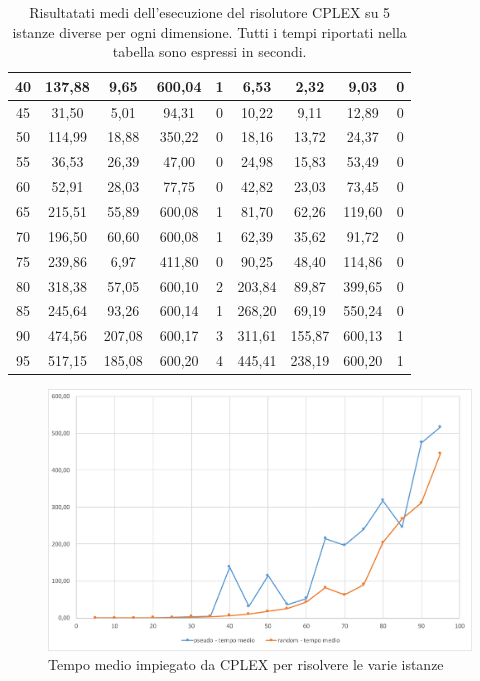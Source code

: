 \begin{table}[htbp]
{\begin{tabular}{c|c|c|c|c|c|c|c|c|}
			\multicolumn{1}{|c|}{40} & 137,88 & 9,65 & 600,04 & 1 & 6,53 & 2,32 & 9,03 & 0 \\ \hline
			\multicolumn{1}{|c|}{45} & 31,50 & 5,01 & 94,31 & 0 & 10,22 & 9,11 & 12,89 & 0 \\ \hline
			\multicolumn{1}{|c|}{50} & 114,99 & 18,88 & 350,22 & 0 & 18,16 & 13,72 & 24,37 & 0 \\ \hline
			\multicolumn{1}{|c|}{55} & 36,53 & 26,39 & 47,00 & 0 & 24,98 & 15,83 & 53,49 & 0 \\ \hline
			\multicolumn{1}{|c|}{60} & 52,91 & 28,03 & 77,75 & 0 & 42,82 & 23,03 & 73,45 & 0 \\ \hline
			\multicolumn{1}{|c|}{65} & 215,51 & 55,89 & 600,08 & 1 & 81,70 & 62,26 & 119,60 & 0 \\ \hline
			\multicolumn{1}{|c|}{70} & 196,50 & 60,60 & 600,08 & 1 & 62,39 & 35,62 & 91,72 & 0 \\ \hline
			\multicolumn{1}{|c|}{75} & 239,86 & 6,97 & 411,80 & 0 & 90,25 & 48,40 & 114,86 & 0 \\ \hline
			\multicolumn{1}{|c|}{80} & 318,38 & 57,05 & 600,10 & 2 & 203,84 & 89,87 & 399,65 & 0 \\ \hline
			\multicolumn{1}{|c|}{85} & 245,64 & 93,26 & 600,14 & 1 & 268,20 & 69,19 & 550,24 & 0 \\ \hline
			\multicolumn{1}{|c|}{90} & 474,56 & 207,08 & 600,17 & 3 & 311,61 & 155,87 & 600,13 & 1 \\ \hline
			\multicolumn{1}{|c|}{95} & 517,15 & 185,08 & 600,20 & 4 & 445,41 & 238,19 & 600,20 & 1 \\ \hline
		\end{tabular}%
	}
	\caption{Risultatati medi dell'esecuzione del risolutore CPLEX su 5 istanze diverse per ogni dimensione. Tutti i tempi riportati nella tabella sono espressi in secondi.}
	\label{tab:cplex-avg}
\end{table}

\begin{figure}[htbp]
	\centering
	\includegraphics[width=\textwidth]{immagini/cplex-time.pdf}
	\caption{Tempo medio impiegato da CPLEX per risolvere le varie istanze}\label{fig:cplex-time}
\end{figure}

